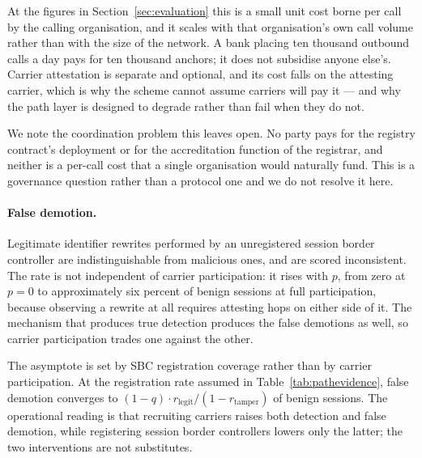 At the figures in Section~\ref{sec:evaluation} this is a small unit cost borne
per call by the calling organisation, and it scales with that organisation's own
call volume rather than with the size of the network. A bank placing ten
thousand outbound calls a day pays for ten thousand anchors; it does not
subsidise anyone else's. Carrier attestation is separate and optional, and its
cost falls on the attesting carrier, which is why the scheme cannot assume
carriers will pay it --- and why the path layer is designed to degrade rather
than fail when they do not.

We note the coordination problem this leaves open. No party pays for the
registry contract's deployment or for the accreditation function of the
registrar, and neither is a per-call cost that a single organisation would
naturally fund. This is a governance question rather than a protocol one and we
do not resolve it here.


%

\paragraph{False demotion.}
Legitimate identifier rewrites performed by an unregistered session border
controller are indistinguishable from malicious ones, and are scored inconsistent.
The rate is not independent of carrier participation: it rises with $p$, from
zero at $p=0$ to approximately six percent of benign sessions at full
participation, because observing a rewrite at all requires attesting hops on
either side of it. The mechanism that produces true detection produces the
false demotions as well, so carrier participation trades one against the other.

The asymptote is set by SBC registration coverage rather than by carrier
participation. At the registration rate assumed in Table~\ref{tab:pathevidence},
false demotion converges to
$(1-q)\cdot r_{\text{legit}}/(1-r_{\text{tamper}})$ of benign sessions. The
operational reading is that recruiting carriers raises both detection and false
demotion, while registering session border controllers lowers only the latter;
the two interventions are not substitutes.


